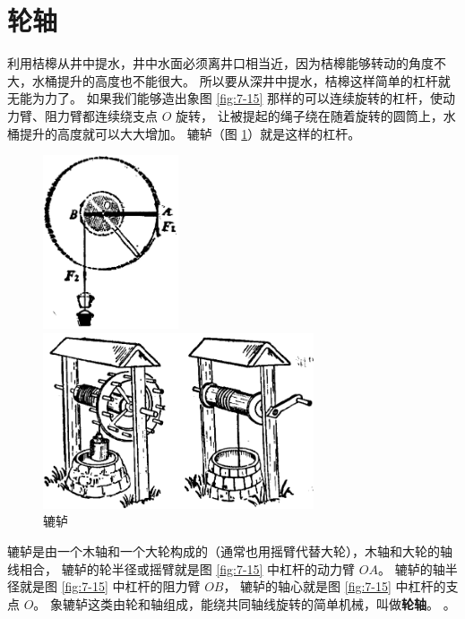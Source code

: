 \section{轮轴}\label{sec:7-4}

利用桔槔从井中提水，井中水面必须离井口相当近，因为桔槔能够转动的角度不大，水桶提升的高度也不能很大。
所以要从深井中提水，桔槔这样简单的杠杆就无能为力了。
如果我们能够造出象图 \ref{fig:7-15} 那样的可以连续旋转的杠杆，使动力臂、阻力臂都连续绕支点 $O$ 旋转，
让被提起的绳子绕在随着旋转的圆筒上，水桶提升的高度就可以大大增加。
辘轳（图 \ref{fig:7-16}）就是这样的杠杆。

\begin{figure}[htbp]
    \centering
    \begin{minipage}{5cm}
    \centering
    \includegraphics[width=4cm]{../pic/czwl1-ch7-15}
    \caption{}\label{fig:7-15}
    \end{minipage}
    \qquad
    \begin{minipage}{9cm}
    \centering
    \includegraphics[width=8cm]{../pic/czwl1-ch7-16}
    \caption{辘轳}\label{fig:7-16}
    \end{minipage}
\end{figure}

辘轳是由一个木轴和一个大轮构成的（通常也用摇臂代替大轮），木轴和大轮的轴线相合，
辘轳的轮半径或摇臂就是图 \ref{fig:7-15} 中杠杆的动力臂 $OA$。
辘轳的轴半径就是图 \ref{fig:7-15} 中杠杆的阻力臂 $OB$，
辘轳的轴心就是图 \ref{fig:7-15} 中杠杆的支点 $O$。
象辘轳这类由轮和轴组成，能绕共同轴线旋转的简单机械，叫做\textbf{轮轴}。
。


